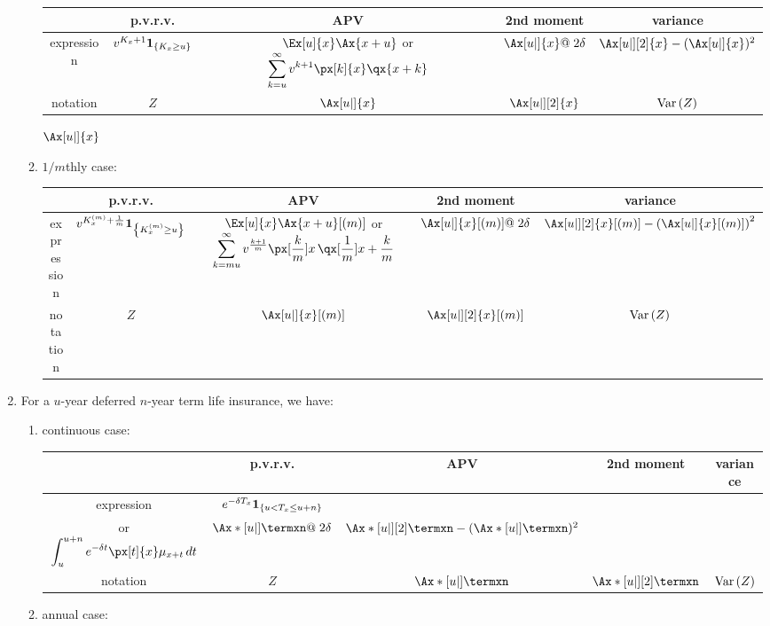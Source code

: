 \begin{enumerate}
\begin{enumerate}
\begin{tabular}{ccccc}
\toprule
&p.v.r.v.&APV&2nd moment&variance\\
\midrule
expression&\(v^{K_x+1}\mathbf{1}_{\left\{K_x\ge u\right\}}\)
&\(\Ex[u]{x}\Ax{x+u}\) or \(\displaystyle\sum_{k=u}^{\infty}v^{k+1}\px[k]{x}\qx{x+k}\)
&\(\Ax[u|]{x}@\;2\delta\)&\(\Ax[u|][2]{x}-(\Ax[u|]{x})^2\)\\
notation&\(Z\)&\(\Ax[u|]{x}\)&\(\Ax[u|][2]{x}\)&\(\operatorname{Var}\qty(Z)\)\\
\bottomrule
\end{tabular}
\(\Ax[u|]{x}\)
\item \(1/m\)thly case:
\label{it:deferred-1m-whole-life-fmlas}

\begin{tabular}{ccccc}
\toprule
&p.v.r.v.&APV&2nd moment&variance\\
\midrule
expression&\(v^{K_x^{(m)}+\frac{1}{m}}\mathbf{1}_{\left\{K_x^{(m)}\ge u\right\}}\)
&\(\Ex[u]{x}\Ax{x+u}[(m)]\) or \(\displaystyle\sum_{k=mu}^{\infty}v^{\frac{k+1}{m}}\px[\frac{k}{m}]{x}\,\qx[\frac{1}{m}]{x+\frac{k}{m}}\)
&\(\Ax[u|]{x}[(m)]@\;2\delta\)&\(\Ax[u|][2]{x}[(m)]-\qty(\Ax[u|]{x}[(m)])^2\)\\
notation&\(Z\)&\(\Ax[u|]{x}[(m)]\)&\(\Ax[u|][2]{x}[(m)]\)&\(\operatorname{Var}\qty(Z)\)\\
\bottomrule
\end{tabular}
\end{enumerate}

\item For a \(u\)-year deferred \(n\)-year term life insurance, we have:
\begin{enumerate}
\item continuous case:
\label{it:deferred-cts-term-life-fmlas}

\begin{tabular}{ccccc}
\toprule
&p.v.r.v.&APV&2nd moment&variance\\
\midrule
expression&\(e^{-\delta T_x}\mathbf{1}_{\left\{u<T_x\le u+n\right\}}\)
&\makecell{\(\Ex[u]{x}\Ax*{\itop{(x+u)}:\angl{n}}\)\\ or \(\displaystyle\int_{u}^{u+n}e^{-\delta t}\px[t]{x}\mu_{x+t}\,dt\)}
&\(\Ax*[u|]{\termxn}@\;2\delta\)&\(\Ax*[u|][2]{\termxn}-(\Ax*[u|]{\termxn})^2\)\\
notation&\(Z\)&\(\Ax*[u|]{\termxn}\)&\(\Ax*[u|][2]{\termxn}\)&\(\operatorname{Var}\qty(Z)\)\\
\bottomrule
\end{tabular}
\item annual case:
\label{it:deferred-annual-term-life-fmlas}


\end{enumerate}
\end{enumerate}
